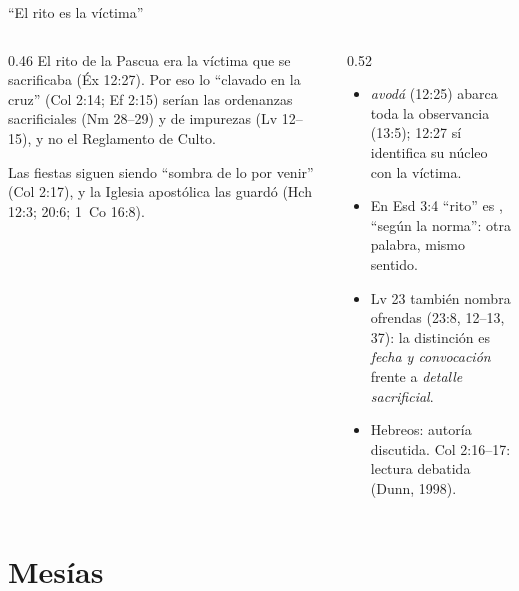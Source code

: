\begin{frame}{``El rito es la víctima''}
\begin{columns}[t,onlytextwidth]
\begin{column}{0.46\textwidth}\small\RaggedRight
El rito de la Pascua era la víctima que se sacrificaba (Éx 12:27). Por eso lo ``clavado en la cruz'' (Col 2:14; Ef 2:15) serían las ordenanzas sacrificiales (Nm 28--29) y de impurezas (Lv 12--15), y no el Reglamento de Culto.\par\smallskip
Las fiestas siguen siendo ``sombra de lo por venir'' (Col 2:17), y la Iglesia apostólica las guardó (Hch 12:3; 20:6; 1~Co 16:8).
\end{column}
\begin{column}{0.52\textwidth}
\begin{tcolorbox}[colback=mostaza!10,colframe=mostaza!85!tierraroja,boxrule=0.6pt,arc=2pt,title={Precisiones},fonttitle=\bfseries\scriptsize,coltitle=caferojizo,colbacktitle=mostaza!30,fontupper=\scriptsize]
\begin{itemize}\scriptsize
\item \emph{avodá} (12:25) abarca toda la observancia (13:5); 12:27 sí identifica su núcleo con la víctima.
\item En Esd 3:4 ``rito'' es , ``según la norma'': otra palabra, mismo sentido.
\item Lv 23 también nombra ofrendas (23:8, 12--13, 37): la distinción es \emph{fecha y convocación} frente a \emph{detalle sacrificial}.
\item Hebreos: autoría discutida. Col 2:16--17: lectura debatida (Dunn, 1998).
\end{itemize}
\end{tcolorbox}
\end{column}
\end{columns}
\end{frame}

\section{Mesías}

